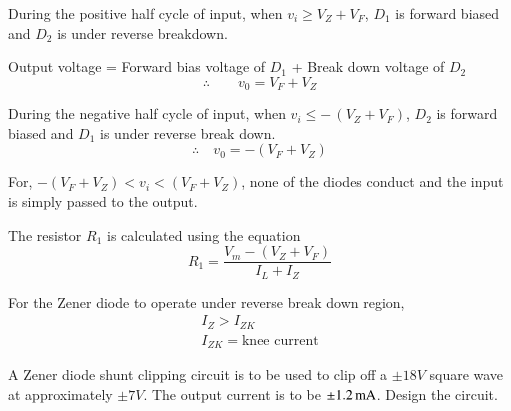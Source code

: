 During the positive half cycle of input, when $v_{i}\geq V_{Z}+V_{F}$, $D_{1}$ is forward biased and $D_{2}$ is under reverse breakdown.

Output voltage = Forward bias voltage of $D_{1}$ + Break down voltage of $D_{2}$
\begin{equation}
\therefore\qquad v_{0}=V_{F}+V_{Z}\label{eq2.128}
\end{equation}

During the negative half cycle of input, when $v_{i}\leq -\,(V_{Z}+V_{F})$, $D_{2}$ is forward biased and $D_{1}$ is under reverse break down.
\begin{equation}
\therefore\quad v_{0}=-(V_{F}+V_{Z})\label{eq2.129}
\end{equation}

For, $-(V_{F}+V_{Z})<v_{i}<(V_{F}+V_{Z})$, none of the diodes conduct and the input is simply passed to the output.

The resistor $R_{1}$ is calculated using the equation
\begin{equation}
R_{1}=\frac{V_{m}-(V_{Z}+V_{F})}{I_{L}+I_{Z}}\label{eq2.130}
\end{equation}

For the Zener diode to operate under reverse break down region,
\begin{gather*}
I_{Z}>I_{ZK}\\[3pt]
I_{ZK}=\text{knee current}
\end{gather*}

\begin{example}\label{exam2.46}
A Zener diode shunt clipping circuit is to be used to clip off a $\pm 18V$ square wave at approximately $\pm 7V$. The output current is to be $\pm 1.2\operatorname{mA}$. Design the circuit.
\end{example}

